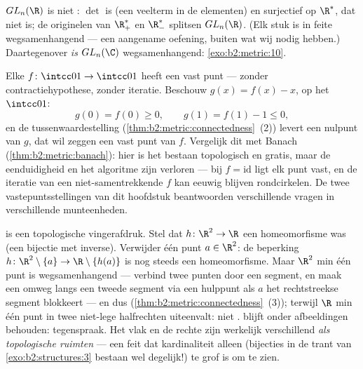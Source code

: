 \begin{example}\label{ex:b2:metric:glnr}
$GL_n(\R)$ is niet : $\det$ is  (een veelterm in
de elementen) en surjectief op $\R^*$, dat niet  is; de
originelen van $\R_+^*$ en $\R_-^*$ splitsen $GL_n(\R)$. (Elk stuk
is in feite wegsamenhangend --- een aangename oefening, buiten wat
wij nodig hebben.) Daartegenover \emph{is} $GL_n(\C)$
wegsamenhangend: \cref{exo:b2:metric:10}.
\end{example}

\begin{example}\label{ex:b2:metric:ivtfixed}
Elke  $f \colon \intcc01 \to \intcc01$ heeft een vast punt
--- zonder contractiehypothese, zonder iteratie. Beschouw $g(x) =
f(x) - x$,  op het  $\intcc01$:
\[
g(0) = f(0) \geq 0,
\qquad
g(1) = f(1) - 1 \leq 0 ,
\]
en de tussenwaardestelling
(\cref{thm:b2:metric:connectedness}~(2)) levert een nulpunt van
$g$, dat wil zeggen een vast punt van $f$. Vergelijk dit met
Banach (\cref{thm:b2:metric:banach}): hier is het bestaan
topologisch en gratis, maar de eenduidigheid en het algoritme zijn
verloren --- bij $f = \mathrm{id}$ ligt elk punt vast, en de
iteratie van een niet-samentrekkende $f$ kan eeuwig blijven
rondcirkelen. De twee vastepuntsstellingen van dit hoofdstuk
beantwoorden verschillende vragen in verschillende munteenheden.
\end{example}

\begin{example}\label{ex:b2:metric:rnotr2}
 is een topologische vingerafdruk. Stel dat $h \colon \R^2
\to \R$ een homeomorfisme was (een  bijectie met 
inverse). Verwijder één punt $a \in \R^2$: de beperking $h \colon
\R^2\setminus\{a\} \to \R\setminus\{h(a)\}$ is nog steeds een
homeomorfisme. Maar $\R^2$ min één punt is wegsamenhangend ---
verbind twee punten door een segment, en maak een omweg langs een
tweede segment via een hulppunt als $a$ het rechtstreekse segment
blokkeert --- en dus 
(\cref{thm:b2:metric:connectedness}~(3)); terwijl $\R$ min één
punt in twee niet-lege  halfrechten uiteenvalt: niet
.  blijft onder  afbeeldingen behouden:
tegenspraak. Het vlak en de rechte zijn werkelijk verschillend
\emph{als topologische ruimten} --- een feit dat kardinaliteit
alleen (bijecties in de trant van \cref{exo:b2:structures:3}
bestaan wel degelijk!) te grof is om te zien.
\end{example}

